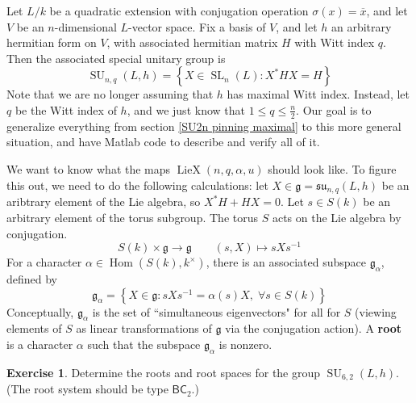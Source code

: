 \documentclass[12pt]{article}
\theoremstyle{definition}
\newtheorem{exercise}[theorem]{Exercise}
\numberwithin{theorem}{subsection}
\newcommand{\sig}{\sigma}
\newcommand{\lb}{\left\{}
\newcommand{\rb}{\right\}}
\newcommand{\tbf}{\textbf}
\newcommand{\inv}{^{-1}}
\newcommand{\ov}{\overline}
\newcommand{\frakg}{\mathfrak{g}}
\newcommand{\fraksu}{\mathfrak{su}}
\DeclareMathOperator{\Hom}{Hom}
\DeclareMathOperator{\SL}{SL}
\DeclareMathOperator{\SU}{SU}
\DeclareMathOperator{\LieX}{LieX}
\begin{document}
Let $L/k$ be a quadratic extension with conjugation operation $\sig(x) = \ov x$, and let $V$ be an $n$-dimensional $L$-vector space. Fix a basis of $V$, and let $h$ an arbitrary hermitian form on $V$, with associated hermitian matrix $H$ with Witt index $q$. Then the associated special unitary group is
\[
	\SU_{n,q}(L,h) = \lb X \in \SL_{n}(L) : X^*HX = H \rb
\]
Note that we are no longer assuming that $h$ has maximal Witt index. Instead, let $q$ be the Witt index of $h$, and we just know that $1 \le q \le \frac{n}{2}$. Our goal is to generalize everything from section \ref{SU2n pinning maximal} to this more general situation, and have Matlab code to describe and verify all of it.

We want to know what the maps $\LieX(n,q,\alpha,u)$ should look like. To figure this out, we need to do the following calculations: let $X \in \frakg =  \fraksu_{n,q}(L,h)$ be an aribtrary element of the Lie algebra, so $X^*H + HX = 0$. Let $s \in S(k)$ be an arbitrary element of the torus subgroup. The torus $S$ acts on the Lie algebra by conjugation.
\[
	S(k) \times \frakg \to \frakg \qquad (s,X) \mapsto sXs \inv
\]
For a character $\alpha \in \Hom(S(k), k^\times)$, there is an associated subspace $\frakg_\alpha$, defined by
\[
	\frakg_\alpha = \lb X \in \frakg : sXs \inv = \alpha(s) X, \; \forall s \in S(k) \rb
\]
Conceptually, $\frakg_\alpha$ is the set of ``simultaneous eigenvectors" for all for $S$ (viewing elements of $S$ as linear transformations of $\frakg$ via the conjugation action). A \tbf{root} is a character $\alpha$ such that the subspace $\frakg_\alpha$ is nonzero. 

\begin{exercise}
Determine the roots and root spaces for the group $\SU_{6,2}(L,h)$. (The root system should be type $\mathsf{BC}_2$.)
\end{exercise}
\end{document}
